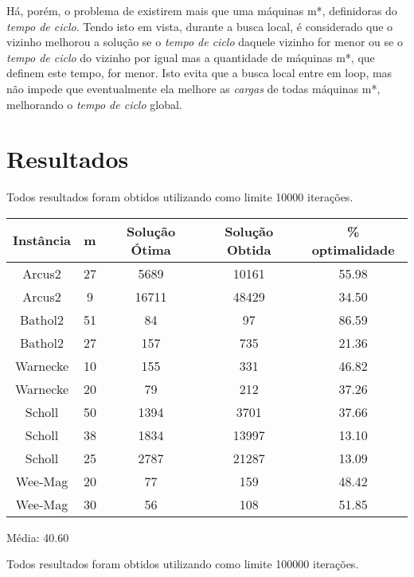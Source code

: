 \documentclass{report}
\begin{document}
Há, porém, o problema de existirem mais que uma máquinas m*, definidoras do \emph{tempo de ciclo}. Tendo isto em vista,
durante a busca local, é considerado que o vizinho melhorou a solução se o \emph{tempo de ciclo} daquele vizinho for
menor ou se o \emph{tempo de ciclo} do vizinho por igual mas a quantidade de máquinas m*, que definem este tempo, for
menor. Isto evita que a busca local entre em loop, mas não impede que eventualmente ela melhore as \emph{cargas} de
todas máquinas m*, melhorando o \emph{tempo de ciclo} global.

\chapter{Resultados}

Todos resultados foram obtidos utilizando como limite 10000 iterações.

\begin{table}[htbp]
 \begin{tabular}{|c|c|c|c|c|}
  \hline
  \textbf{Instância} & \textbf{m} & \textbf{Solução Ótima} & \textbf{Solução Obtida} & \% optimalidade \\
  \hline
  Arcus2 & 27 & 5689 & 10161 & 55.98 \\ %
  \hline
  Arcus2 & 9 & 16711 & 48429 & 34.50 \\ %
  \hline
  Bathol2 & 51 & 84 & 97 & 86.59 \\ %
  \hline
  Bathol2 & 27 & 157 & 735 & 21.36 \\ %
  \hline
  Warnecke & 10 & 155 & 331 & 46.82 \\ %
  \hline
  Warnecke & 20 & 79 & 212 & 37.26 \\ %
  \hline
  Scholl & 50 & 1394 & 3701 & 37.66 \\ %
  \hline
  Scholl & 38 & 1834 & 13997 & 13.10 \\ %
  \hline
  Scholl & 25 & 2787 & 21287 & 13.09 \\ %
  \hline
  Wee-Mag & 20 & 77 & 159 & 48.42 \\ %
  \hline
  Wee-Mag & 30 & 56 & 108 & 51.85 \\ %
  \hline
 \end{tabular}
\end{table}

Média: 40.60


Todos resultados foram obtidos utilizando como limite 100000 iterações.
\end{document}
